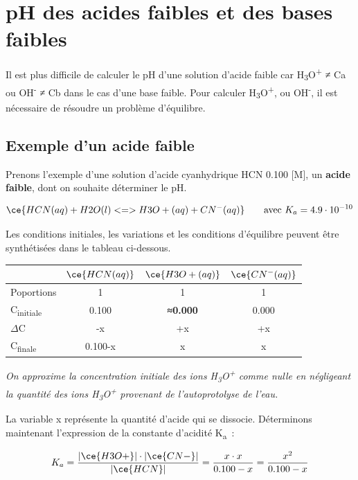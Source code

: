 \documentclass[
  11pt,
  french,
  a4paper,
  openany]{book}
\begin{document}
\clearpage

\hypertarget{ph-des-acides-faibles-et-des-bases-faibles}{%
\section{pH des acides faibles et des bases faibles}\label{ph-des-acides-faibles-et-des-bases-faibles}}

Il est plus difficile de calculer le pH d'une solution d'acide faible car \textbar H\textsubscript{3}O\textsuperscript{+}\textbar{} ≠ Ca ou \textbar OH\textsuperscript{-}\textbar{} ≠ Cb dans le cas d'une base faible. Pour calculer \textbar H\textsubscript{3}O\textsuperscript{+}\textbar, ou \textbar OH\textsuperscript{-}\textbar, il est nécessaire de résoudre un problème d'équilibre.

\hypertarget{exemple-dun-acide-faible}{%
\subsection{Exemple d'un acide faible}\label{exemple-dun-acide-faible}}

Prenons l'exemple d'une solution d'acide cyanhydrique HCN 0.100 {[}M{]}, un \textbf{acide faible}, dont on souhaite déterminer le pH.

\[
\ce{HCN(aq) + H2O(l) <=> H3O+(aq) + CN^{-}(aq)} \qquad \text{avec } K_a = 4.9 \cdot 10^{-10}
\]

Les conditions initiales, les variations et les conditions d'équilibre peuvent être synthétisées dans le tableau ci-dessous.

\begin{longtable}[]{@{}lccc@{}}
\toprule
& \(\ce{HCN(aq)}\) & \(\ce{H3O+(aq)}\) & \(\ce{CN^{-}(aq)}\)\tabularnewline
\midrule
\endhead
Poportions & 1 & 1 & 1\tabularnewline
C\textsubscript{initiale} & 0.100 & \textbf{≈0.000} & 0.000\tabularnewline
\(\Delta\)C & -x & +x & +x\tabularnewline
C\textsubscript{finale} & 0.100-x & x & x\tabularnewline
\bottomrule
\end{longtable}

\emph{On approxime la concentration initiale des ions H\textsubscript{3}O\textsuperscript{+} comme nulle en négligeant la quantité des ions H\textsubscript{3}O\textsuperscript{+} provenant de l'autoprotolyse de l'eau.}

La variable x représente la quantité d'acide qui se dissocie. Déterminons maintenant l'expression de la constante d'acidité K\textsubscript{a}~:

\[
K_a = \frac{|\ce{H3O+}| \cdot |\ce{CN-}|}{|\ce{HCN}|} = \frac{x \cdot x}{0.100 - x} = \frac{x^2}{0.100 - x}
\]
\end{document}
